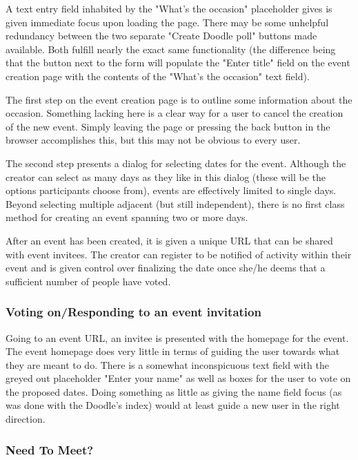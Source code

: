 \documentclass{sigchi}
\begin{document}
A text entry field inhabited by the "What's the occasion"
placeholder gives is given immediate focus upon loading the
page. There may be some unhelpful redundancy between the two
separate "Create Doodle poll" buttons made available. Both fulfill
nearly the exact same functionality (the difference being that the
button next to the form will populate the "Enter title" field on the
event creation page with the contents of the "What's the occasion"
text field).

The first step on the event creation page is to outline some
information about the occasion. Something lacking here is a clear
way for a user to cancel the creation of the new event. Simply
leaving the page or pressing the back button in the browser
accomplishes this, but this may not be obvious to every user.

The second step presents a dialog for selecting dates for the
event. Although the creator can select as many days as they like in
this dialog (these will be the options participants choose from),
events are effectively limited to single days. Beyond selecting
multiple adjacent (but still independent), there is no first class
method for creating an event spanning two or more days. 

After an event has been created, it is given a unique URL that can
be shared with event invitees. The creator can register to be
notified of activity within their event and is given control over
finalizing the date once she/he deems that a sufficient number of
people have voted.

\subsubsection{Voting on/Responding to an event invitation}

Going to an event URL, an invitee is presented with the homepage for
the event. The event homepage does very little in terms of guiding
the user towards what they are meant to do. There is a somewhat
inconspicuous text field with the greyed out placeholder "Enter your
name" as well as boxes for the user to vote on the proposed
dates. Doing something as little as giving the name field focus (as
was done with the Doodle's index) would at least guide a new user in
the right direction.

\subsubsection{Need To Meet?}
\end{document}
